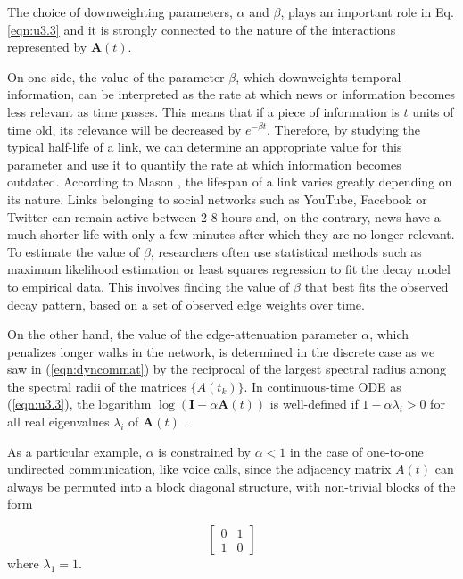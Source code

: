 \begin{highlightedParagraphC}
 
The choice of downweighting parameters, $\alpha$ and $\beta$, plays an important role in Eq. \ref{eqn:u3.3} and it is strongly connected to the nature of the interactions represented by $\mathbf{A}(t)$.

\end{highlightedParagraphC}

On one side, the value of the parameter $\beta$, which downweights temporal information, can be interpreted as the rate at which news or information becomes less relevant as time passes. This means that if a piece of information is $t$ units of time old, its relevance will be decreased by $e^{−\beta t}$. Therefore, by studying the typical half-life of a link, we can determine an appropriate value for this parameter and use it to quantify the rate at which information becomes outdated. According to Mason \cite{lifespan}, the lifespan of a link varies greatly depending on its nature. Links belonging to social networks such as YouTube, Facebook or Twitter can remain active between 2-8 hours and, on the contrary, news have a much shorter life with only a few minutes after which they are no longer relevant. To estimate the value of $\beta$, researchers often use statistical methods such as maximum likelihood estimation or least squares regression to fit the decay model to empirical data. This involves finding the value of $\beta$ that best fits the observed decay pattern, based on a set of observed edge weights over time.

On the other hand, the value of the edge-attenuation parameter $\alpha$, which penalizes longer walks in the network, is determined in the discrete case as we saw in (\ref{eqn:dyncommat}) by the reciprocal of the largest spectral radius among the spectral radii of the matrices $\{A(t_k)\}$. In continuous-time ODE as (\ref{eqn:u3.3}), the logarithm $\log(\mathbf{I} - \alpha \mathbf{A}(t))$ is well-defined if $1 - \alpha \lambda_i > 0$ for all real eigenvalues $\lambda_i$ of $\mathbf{A}(t)$ \cite{higham2008functions}.

As a particular example, $\alpha$ is constrained by $\alpha < 1$ in the case of one-to-one undirected communication, like voice calls, since the adjacency matrix $A(t)$ can always be permuted into a block diagonal structure, with non-trivial blocks of the form 

$$\begin{bmatrix}
0 & 1\\
1 & 0 
\end{bmatrix}$$ where $\lambda_1=1$.

